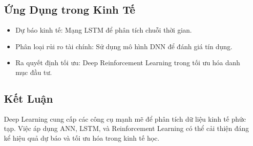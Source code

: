 \subsection{Ứng Dụng trong Kinh Tế}
\begin{itemize}
    \item Dự báo kinh tế: Mạng LSTM để phân tích chuỗi thời gian.
    \item Phân loại rủi ro tài chính: Sử dụng mô hình DNN để đánh giá tín dụng.
    \item Ra quyết định tối ưu: Deep Reinforcement Learning trong tối ưu hóa danh mục đầu tư.
\end{itemize}

\subsection{Kết Luận}
Deep Learning cung cấp các công cụ mạnh mẽ để phân tích dữ liệu kinh tế phức tạp. Việc áp dụng ANN, LSTM, và Reinforcement Learning có thể cải thiện đáng kể hiệu quả dự báo và tối ưu hóa trong kinh tế học.





